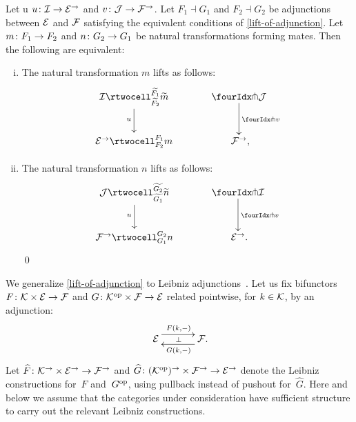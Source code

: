 \documentclass[reqno,10pt,a4paper,oneside,draft]{amsart}
\begin{document}
{{\begin{proposition} \label{lift-of-mates}
Let u $u \co \cal{I} \to \catE^\to$ and $v \co \cal{J} \to \cal{F}^\to$.
Let $F_1 \dashv G_1$ and $F_2 \dashv G_2$ be adjunctions between $\cal{E}$ and $\cal{F}$ satisfying the equivalent conditions of \cref{lift-of-adjunction}.
Let $m \co F_1 \to F_2$ and $n \co G_2 \to G_1$ be natural transformations forming mates.
Then the following are equivalent:
\begin{enumerate}[(i)]
\item
The natural transformation $m$ lifts as follows:
\[
\xymatrix@C=1.2cm{
  \cal{I}
  \rtwocell_{\widetilde{F_2}}^{\widetilde{F_1}}{\widetilde{m}}
  \ar[d]_{u}
&
  \liftl{\cal{J}}
  \ar[d]^{\liftl{v}}
\\
  \catE^\to
  \rtwocell_{F_2}^{F_1}{m}
&
  \cal{F}^\to
\rlap{,}}
\]
\item
The natural transformation $n$ lifts as follows:
\[
\xymatrix@C=1.2cm{
  \cal{J}
  \rtwocell_{\widetilde{G_1}}^{\widetilde{G_2}}{\widetilde{n}}
  \ar[d]_{u}
&
  \liftr{\cal{I}}
  \ar[d]^{\liftl{v}}
\\
  \cal{F}^\to
  \rtwocell_{G_1}^{G_2}{n}
&
  \cal{E}^\to
\rlap{.}}
\]
\qed
\end{enumerate}
\end{proposition}

We generalize \cref{lift-of-adjunction} to Leibniz adjunctions~\cite{riehl-verity:reedy}.
Let us fix bifunctors $F \co \cal{K} \times \catE \to \cal{F}$ and $G \co \cal{K}^{\op} \times \cal{F} \to \catE$ related pointwise, for $k \in \cal{K}$, by an adjunction:
\[
\xymatrix@C+1em{
  \catE
  \ar@<5pt>[r]^{F(k, \arghole)}
  \ar@{}[r]|{\bot}
&
  \cal{F}
  \ar@<5pt>[l]^{G(k, \arghole)}
\rlap{.}}
\]
Let $ \widehat{F} \co \cal{K}^\to \times \catE^\to \to \cal{F}^\to$ and $ \widehat{G} \co (\cal{K}^{\op})^\to \times \cal{F}^\to \to \catE^\to$ denote the Leibniz constructions for~$F$ and~$G^{\op}$, using pullback instead of pushout for~$\widehat{G}$.
Here and below we assume that the categories under consideration have sufficient structure to carry out the relevant Leibniz constructions.

}}
\end{document}
